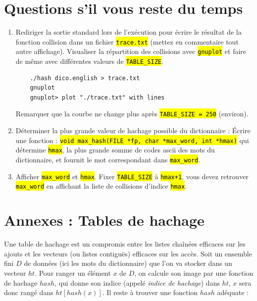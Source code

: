 \documentclass[final, pdftex, a4paper, openbib, ]{article}
\let\OldTexttt\texttt
\renewcommand{\texttt}[1]{\OldTexttt{\hl{#1}}}
\begin{document}
\section{Questions s'il vous reste du temps}
\begin{enumerate}
	\item Rediriger la sortie standard lors de l'exécution pour écrire le résultat de la fonction collision dans un fichier \texttt{trace.txt} (mettez en commentaire tout autre affichage).
	Visualiser la répartition des collisions avec \texttt{gnuplot} et faire de même avec différentes valeurs de \texttt{TABLE\_SIZE}.
\begin{verbatim}
	./hash dico.english > trace.txt
	gnuplot
	gnuplot> plot "./trace.txt" with lines
\end{verbatim}
	Remarquer que la courbe ne change plus après \texttt{TABLE\_SIZE = 250} (environ).
	\item Déterminer la plus grande valeur de hachage possible du dictionnaire : Écrire une fonction : \texttt{void max\_hash(FILE *fp, char *max\_word, int *hmax)} qui détermine \texttt{hmax}, la plus grande somme de codes ascii des mots du dictionnaire, et fournit le mot correspondant dans \texttt{max\_word}.
	\item Afficher \texttt{max\_word} et \texttt{hmax}. Fixer \texttt{TABLE\_SIZE} à \texttt{hmax+1}, vous devez retrouver \texttt{max\_word} en affichant la liste de collisions d'indice \texttt{hmax}.
\end{enumerate}


\section{Annexes : Tables de hachage}

Une table de hachage est un compromis entre les listes chaînées efficaces sur les ajouts et les vecteurs (ou listes contiguës) efficaces sur les accès. Soit un ensemble fini $D$ de données (ici les mots du dictionnaire) que l'on va stocker dans un vecteur $ht$.
Pour ranger un élément $x$ de $D$, on calcule son image par une fonction de hachage $hash$, qui donne son indice (appelé \textit{indice de hachage}) dans $ht$, $x$ sera donc rangé dans $ht[hash(x)]$.
Il reste à trouver une fonction $hash$ adéquate :
\end{document}
